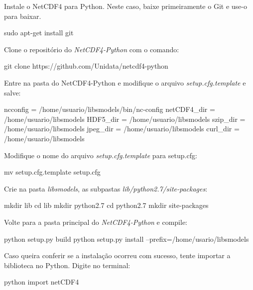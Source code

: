 \noindent Instale o NetCDF4 para Python. Neste caso, baixe primeiramente o Git e use-o para baixar.
\bigskip

\begin{bashcode}
sudo apt-get install git
\end{bashcode}
\bigskip

\noindent Clone o repositório do \textit{NetCDF4-Python} com o comando:
\bigskip

\begin{bashcode}
git clone https://github.com/Unidata/netcdf4-python
\end{bashcode}
\bigskip

\noindent Entre na pasta do NetCDF4-Python e modifique o arquivo \textit{setup.cfg.template} e salve:
\bigskip

\begin{bashcode}
ncconfig    = /home/usuario/libsmodels/bin/nc-config
netCDF4_dir = /home/usuario/libsmodels
HDF5_dir    = /home/usuario/libsmodels
szip_dir    = /home/usuario/libsmodels
jpeg_dir    = /home/usuario/libsmodels
curl_dir    = /home/usuario/libsmodels
\end{bashcode}
\bigskip

\noindent Modifique o nome do arquivo \textit{setup.cfg.template} para setup.cfg:
\bigskip

\begin{bashcode}
mv setup.cfg.template setup.cfg
\end{bashcode}
\bigskip

\noindent Crie na pasta \textit{libsmodels}, as subpastas \textit{lib/python2.7/site-packages}:
\bigskip

\begin{bashcode}
mkdir lib
cd lib
mkdir python2.7
cd python2.7
mkdir site-packages
\end{bashcode}
\bigskip

\noindent Volte para a pasta principal do \textit{NetCDF4-Python} e compile:
\bigskip

\begin{bashcode}
python setup.py build
python setup.py install --prefix=/home/usario/libsmodels
\end{bashcode}
\bigskip

\noindent Caso queira conferir se a instalação ocorreu com sucesso, tente importar a biblioteca no Python. Digite no terminal:
\bigskip

\begin{bashcode}
python
import netCDF4
\end{bashcode}
\bigskip


